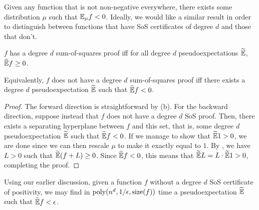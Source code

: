	Given any function that is not non-negative everywhere, there exists some distribution $\mu$ such that $\mathbb{E}_\mu f < 0$. Ideally, we would like a similar result in order to distinguish between functions that have SoS certificates of degree $d$ and those that don't.

	\begin{ftheo}
		\label{theo: sos-pe-equiv}
		$f$ has a degree $d$ sum-of-squares proof iff for all degree $d$ pseudoexpectations $\widetilde{\mathbb{E}}$, $\widetilde{\mathbb{E}} f \ge 0$.
	\end{ftheo}
	Equivalently, $f$ does not have a degree $d$ sum-of-squares proof iff there exists a degree $d$ pseudoexpectation $\widetilde{\mathbb{E}}$ such that $\widetilde{\mathbb{E}} f < 0$.
	\begin{proof}
		The forward direction is straightforward by (b). For the backward direction, suppose instead that $f$ does not have a degree $d$ SoS proof. Then, there exists a separating hyperplane between $f$ and this set, that is, some degree $d$ pseudoexpectation $\widetilde{\mathbb{E}}$ such that $\widetilde{\mathbb{E}} f < 0$. If we manage to show that $\widetilde{\mathbb{E}} 1 > 0$, we are done since we can then rescale $\mu$ to make it exactly equal to $1$. By , we have $L > 0$ such that $\widetilde{\mathbb{E}} (f+L) \ge 0$. Since $\widetilde{\mathbb{E}} f < 0$, this means that $\widetilde{\mathbb{E}} L = L \cdot \widetilde{\mathbb{E}} 1 > 0$, completing the proof.
	\end{proof}

	Using our earlier discussion, given a function $f$ without a degree $d$ SoS certificate of positivity, we may find in $\operatorname{poly}(n^d,1/\epsilon,\operatorname{size}(f))$ time a pseudoexpectation $\widetilde{\mathbb{E}}$ such that $\widetilde{\mathbb{E}} f < \epsilon$.


